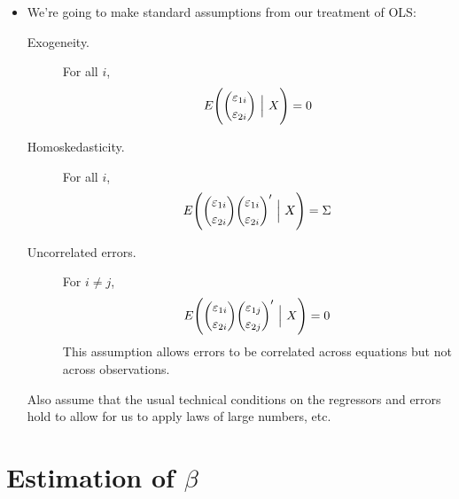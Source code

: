\begin{itemize}[leftmargin=0pt]
\item We're going to make standard assumptions from our treatment of
  OLS:
  \begin{description}
  \item[Exogeneity.] For all $i$,
    \begin{equation*}
      E\Bigg(\binom{\vep_{1i}}{\vep_{2i}} \ \Big|\ X\Bigg) = 0
    \end{equation*}
  \item[Homoskedasticity.] For all $i$,
    \begin{equation*}
      E\Bigg(\binom{\varepsilon_{1i}}{\varepsilon_{2i}} \binom{\varepsilon_{1i}}{\varepsilon_{2i}}'
      \ \Big|\ X \Bigg) = \Sigma
    \end{equation*}
  \item[Uncorrelated errors.] For $i \neq j$,
    \begin{equation*}
      E\Bigg(\binom{\varepsilon_{1i}}{\varepsilon_{2i}}
      \binom{\varepsilon_{1j}}{\varepsilon_{2j}}' \ \Big|\ X \Bigg) = 0
    \end{equation*}
    This assumption allows errors to be correlated across equations
    but not across observations.
  \end{description}
  
  Also assume that the usual technical conditions on the regressors
  and errors hold to allow for us to apply laws of large numbers, etc.

\end{itemize}

\section{Estimation of $\beta$}

